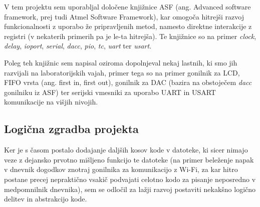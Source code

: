 \documentclass[12pt,a4paper,twoside,openright,slovene]{book}
\begin{document}
V tem projektu sem uporabljal določene knjižnice ASF (ang. Advanced software framework, prej tudi Atmel Software Framework), kar omogoča hitrejši razvoj funkcionalnosti z uporabo že pripravljenih metod, namesto direktne interakcije z registri (v nekaterih primerih pa je le-ta hitrejša). Te knjižnice so na primer \textit{clock}, \textit{delay}, \textit{ioport}, \textit{serial}, \textit{dacc}, \textit{pio}, \textit{tc}, \textit{uart} ter \textit{usart}.

Poleg teh knjižnic sem napisal oziroma dopolnjeval nekaj lastnih, ki smo jih razvijali na laboratorijskih vajah, primer tega so na primer gonilnik za LCD, FIFO vrsta (ang. first in, first out), gonilnik za DAC (bazira na obstoječem \textit{dacc} gonilniku iz ASF) ter serijski vmesniki za uporabo UART in USART komunikacije na višjih nivojih.

\subsection{Logična zgradba projekta} \label{due_radio_struktura_projekta}
Ker je s časom postalo dodajanje daljših kosov kode v datoteke, ki sicer nimajo veze z dejansko prvotno mišljeno funkcijo te datoteke (na primer beleženje napak v dnevnik dogodkov znotraj gonilnika za komunikacijo z Wi-Fi, za kar hitro postane precej nepraktično vsakič podvajati celotno kodo za pisanje neposredno v medpomnilnik dnevnika), sem se odločil za lažji razvoj postaviti nekakšno logično delitev in abstrakcijo kode.
\end{document}
